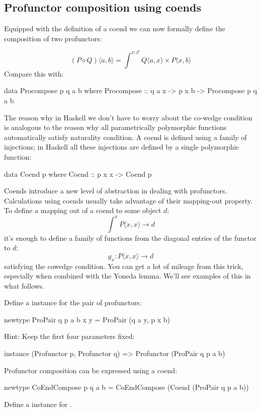 \documentclass[DaoFP]{subfiles}
\begin{document}
\subsection{Profunctor composition using coends}

Equipped with the definition of a coend we can now formally define the composition of two profunctors:

\[ (P \diamond Q)\langle a, b \rangle = \int^{x\colon \mathcal{C}} Q \langle a, x \rangle \times P \langle x, b \rangle\]
Compare this with:
\begin{haskell}
data Procompose p q a b where
  Procompose ::  q a x -> p x b -> Procompose p q a b
\end{haskell}

The reason why in Haskell we don't have to worry about the co-wedge condition is analogous to the reason why all parametrically polymorphic functions automatically satisfy naturality condition. A coend is defined using a family of injections; in Haskell all these injections are defined by a single polymorphic function:
\begin{haskell}
data Coend p where
  Coend ::  p x x -> Coend p
\end{haskell}

Coends introduce a new level of abstraction in dealing with profunctors. Calculations using coends usually take advantage of their mapping-out property. To define a mapping out of a coend to some object $d$:
\[ \int^x P \langle x, x \rangle \to d \]
 it's enough to define a family of functions from the diagonal entries of the functor to $d$:
 \[ g_x \colon P \langle x, x \rangle \to d \]
 satisfying the cowedge condition. You can get a lot of mileage from this trick, especially when combined with the Yoneda lemma. We'll see examples of this in what follows.

\begin{exercise}
Define a  instance for the pair of profunctors:
\begin{haskell}
newtype ProPair q p a b x y = ProPair (q a y, p x b)
\end{haskell}
Hint: Keep the first four parameters fixed:
\begin{haskell}
instance (Profunctor p, Profunctor q) => Profunctor (ProPair q p a b)
\end{haskell}
\end{exercise}

\begin{exercise}
Profunctor composition can be expressed using a coend:
\begin{haskell}
newtype CoEndCompose p q a b = CoEndCompose (Coend (ProPair q p a b))
\end{haskell}
Define a  instance for .
\end{exercise}
\end{document}
